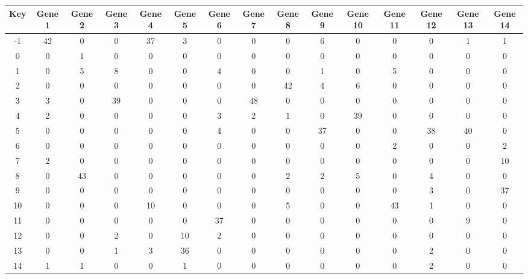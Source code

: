 \begin{tabular}{|c|c|c|c|c|c|c|c|c|c|c|c|c|c|c|}
\hline
Key & Gene 1 & Gene 2 & Gene 3 & Gene 4 & Gene 5 & Gene 6 & Gene 7 & Gene 8 & Gene 9 & Gene 10 & Gene 11 & Gene 12 & Gene 13 & Gene 14 \\
\hline
-1 & 42 & 0 & 0 & 37 & 3 & 0 & 0 & 0 & 6 & 0 & 0 & 0 & 1 & 1 \\
0 & 0 & 1 & 0 & 0 & 0 & 0 & 0 & 0 & 0 & 0 & 0 & 0 & 0 & 0 \\
1 & 0 & 5 & 8 & 0 & 0 & 4 & 0 & 0 & 1 & 0 & 5 & 0 & 0 & 0 \\
2 & 0 & 0 & 0 & 0 & 0 & 0 & 0 & 42 & 4 & 6 & 0 & 0 & 0 & 0 \\
3 & 3 & 0 & 39 & 0 & 0 & 0 & 48 & 0 & 0 & 0 & 0 & 0 & 0 & 0 \\
4 & 2 & 0 & 0 & 0 & 0 & 3 & 2 & 1 & 0 & 39 & 0 & 0 & 0 & 0 \\
5 & 0 & 0 & 0 & 0 & 0 & 4 & 0 & 0 & 37 & 0 & 0 & 38 & 40 & 0 \\
6 & 0 & 0 & 0 & 0 & 0 & 0 & 0 & 0 & 0 & 0 & 2 & 0 & 0 & 2 \\
7 & 2 & 0 & 0 & 0 & 0 & 0 & 0 & 0 & 0 & 0 & 0 & 0 & 0 & 10 \\
8 & 0 & 43 & 0 & 0 & 0 & 0 & 0 & 2 & 2 & 5 & 0 & 4 & 0 & 0 \\
9 & 0 & 0 & 0 & 0 & 0 & 0 & 0 & 0 & 0 & 0 & 0 & 3 & 0 & 37 \\
10 & 0 & 0 & 0 & 10 & 0 & 0 & 0 & 5 & 0 & 0 & 43 & 1 & 0 & 0 \\
11 & 0 & 0 & 0 & 0 & 0 & 37 & 0 & 0 & 0 & 0 & 0 & 0 & 9 & 0 \\
12 & 0 & 0 & 2 & 0 & 10 & 2 & 0 & 0 & 0 & 0 & 0 & 0 & 0 & 0 \\
13 & 0 & 0 & 1 & 3 & 36 & 0 & 0 & 0 & 0 & 0 & 0 & 2 & 0 & 0 \\
14 & 1 & 1 & 0 & 0 & 1 & 0 & 0 & 0 & 0 & 0 & 0 & 2 & 0 & 0 \\
\hline
\end{tabular}
